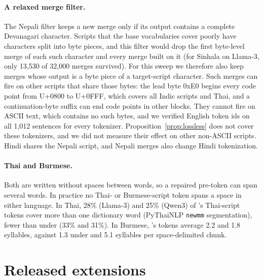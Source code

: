 \paragraph{A relaxed merge filter.} The Nepali filter keeps a new merge only if its output contains a complete Devanagari character. Scripts that the base vocabularies cover poorly have characters split into byte pieces, and this filter would drop the first byte-level merge of each such character and every merge built on it (for Sinhala \RII{} on Llama-3, only 13{,}530 of 32{,}000 merges survived). For this sweep we therefore also keep merges whose output is a byte piece of a target-script character. Such merges can fire on other scripts that share those bytes: the lead byte 0xE0 begins every code point from U+0800 to U+0FFF, which covers all Indic scripts and Thai, and a continuation-byte suffix can end code points in other blocks. They cannot fire on ASCII text, which contains no such bytes, and we verified English token ids on all 1{,}012 sentences for every tokenizer. Proposition~\ref{prop:lossless} does not cover these tokenizers, and we did not measure their effect on other non-ASCII scripts. Hindi shares the Nepali script, and Nepali merges also change Hindi tokenization.

\paragraph{Thai and Burmese.} Both are written without spaces between words, so a repaired pre-token can span several words. In practice no \RII{} Thai- or Burmese-script token spans a space in either language. In Thai, 28\% (Llama-3) and 25\% (Qwen3) of \RII{}'s Thai-script tokens cover more than one dictionary word (PyThaiNLP \texttt{newmm} segmentation), fewer than under \RI{} (33\% and 31\%). In Burmese, \RII{}'s tokens average 2.2 and 1.8 syllables, against 1.3 under \RI{} and 5.1 syllables per space-delimited chunk.

\section{Released extensions}
\label{app:released}


